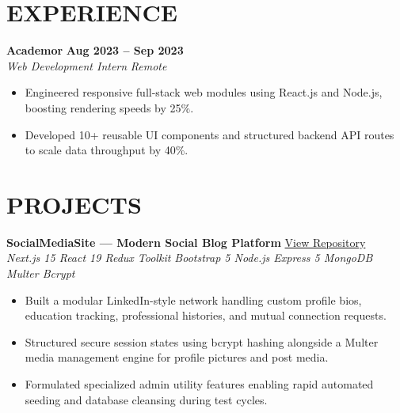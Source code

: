 \documentclass[10.5pt,a4paper]{article}
\newcommand{\role}[2]{%
  {\bfseries\color{primary} #1} \hfill {\bfseries\small #2}%
}
\newcommand{\subrole}[2]{%
  \textit{#1} \hfill \textit{\small #2}%
}
\newcommand{\projectline}[2]{%
  {\bfseries\color{primary} #1} \hfill {\small\color{secondary} #2}%
}
\begin{document}
\section{EXPERIENCE}

\role{Academor}{Aug 2023 -- Sep 2023}\\
\subrole{Web Development Intern}{Remote}
\begin{itemize}
  \item Engineered responsive full-stack web modules using React.js and Node.js, boosting rendering speeds by 25\%.
  \item Developed 10+ reusable UI components and structured backend API routes to scale data throughput by 40\%.
\end{itemize}

\section{PROJECTS}

\projectline{SocialMediaSite --- Modern Social Blog Platform}{\href{https://github.com/Amjadkhan9756/Postblog}{View Repository}}\\
{\small\textit{Next.js 15 \;\textbullet\; React 19 \;\textbullet\; Redux Toolkit \;\textbullet\; Bootstrap 5 \;\textbullet\; Node.js \;\textbullet\; Express 5 \;\textbullet\; MongoDB \;\textbullet\; Multer \;\textbullet\; Bcrypt}}
\begin{itemize}
  \item Built a modular LinkedIn-style network handling custom profile bios, education tracking, professional histories, and mutual connection requests.
  \item Structured secure session states using bcrypt hashing alongside a Multer media management engine for profile pictures and post media.
  \item Formulated specialized admin utility features enabling rapid automated seeding and database cleansing during test cycles.
\end{itemize}
\end{document}
